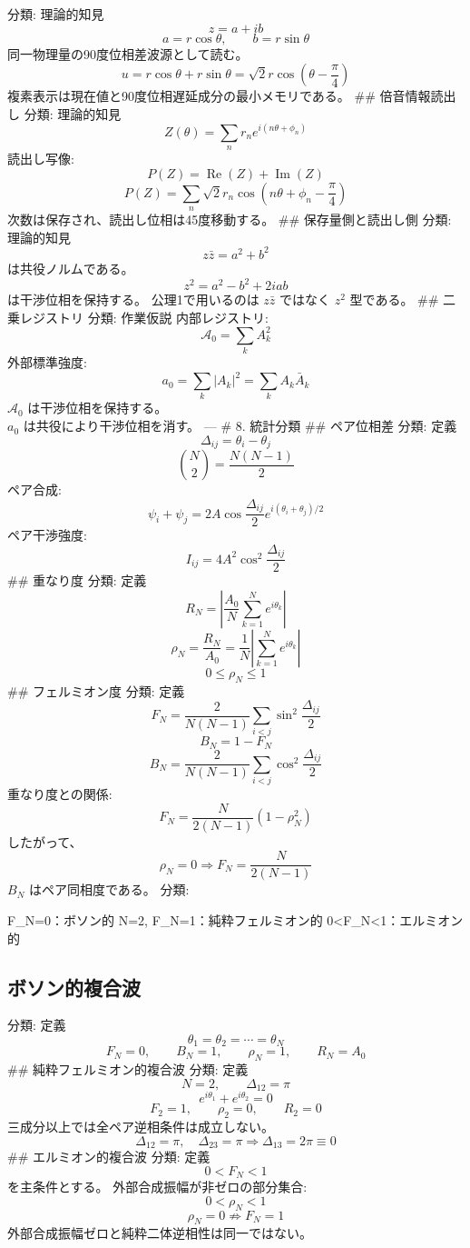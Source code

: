 \documentclass[
  a4paper,
]{ltjsarticle}
\newenvironment{Shaded}{}{}
\newcommand{\NormalTok}[1]{#1}
\begin{document}
分類: 理論的知見 \[
z=a+ib
\] \[
a=r\cos\theta,\qquad b=r\sin\theta
\] 同一物理量の90度位相差波源として読む。 \[
u=r\cos\theta+r\sin\theta
=\sqrt2 r\cos\left(\theta-\frac{\pi}{4}\right)
\] 複素表示は現在値と90度位相遅延成分の最小メモリである。 \#\#
倍音情報読出し 分類: 理論的知見 \[
Z(\theta)=\sum_n r_n e^{i(n\theta+\phi_n)}
\] 読出し写像: \[
P(Z)=\operatorname{Re}(Z)+\operatorname{Im}(Z)
\] \[
P(Z)=\sum_n \sqrt2 r_n
\cos\left(n\theta+\phi_n-\frac{\pi}{4}\right)
\] 次数は保存され、読出し位相は45度移動する。 \#\# 保存量側と読出し側
分類: 理論的知見 \[
z\bar z=a^2+b^2
\] は共役ノルムである。 \[
z^2=a^2-b^2+2iab
\] は干渉位相を保持する。 公理1で用いるのは \(z\bar z\) ではなく \(z^2\)
型である。 \#\# 二乗レジストリ 分類: 作業仮説 内部レジストリ: \[
\mathcal{A}_0=\sum_k A_k^2
\] 外部標準強度: \[
a_0=\sum_k |A_k|^2=\sum_k A_k\bar A_k
\] \(\mathcal{A}_0\) は干渉位相を保持する。\\
\(a_0\) は共役により干渉位相を消す。 --- \# 8. 統計分類 \#\# ペア位相差
分類: 定義 \[
\Delta_{ij}=\theta_i-\theta_j
\] \[
\binom{N}{2}=\frac{N(N-1)}{2}
\] ペア合成: \[
\psi_i+\psi_j
=2A\cos\frac{\Delta_{ij}}{2}e^{i(\theta_i+\theta_j)/2}
\] ペア干渉強度: \[
I_{ij}=4A^2\cos^2\frac{\Delta_{ij}}{2}
\] \#\# 重なり度 分類: 定義 \[
R_N=\left|\frac{A_0}{N}\sum_{k=1}^{N}e^{i\theta_k}\right|
\] \[
\rho_N=\frac{R_N}{A_0}
=\frac{1}{N}\left|\sum_{k=1}^{N}e^{i\theta_k}\right|
\] \[
0\le\rho_N\le1
\] \#\# フェルミオン度 分類: 定義 \[
F_N=
\frac{2}{N(N-1)}
\sum_{i<j}\sin^2\frac{\Delta_{ij}}{2}
\] \[
B_N=1-F_N
\] \[
B_N=
\frac{2}{N(N-1)}
\sum_{i<j}\cos^2\frac{\Delta_{ij}}{2}
\] 重なり度との関係: \[
F_N=\frac{N}{2(N-1)}(1-\rho_N^2)
\] したがって、 \[
\rho_N=0\Rightarrow F_N=\frac{N}{2(N-1)}
\] \(B_N\) はペア同相度である。 分類:

\begin{Shaded}
\begin{Highlighting}[]
\NormalTok{F\_N=0：ボソン的}
\NormalTok{N=2, F\_N=1：純粋フェルミオン的}
\NormalTok{0\textless{}F\_N\textless{}1：エルミオン的}
\end{Highlighting}
\end{Shaded}

\subsection{ボソン的複合波}\label{ux30dcux30bdux30f3ux7684ux8907ux5408ux6ce2}

分類: 定義 \[
\theta_1=\theta_2=\cdots=\theta_N
\] \[
F_N=0,\qquad B_N=1,\qquad \rho_N=1,\qquad R_N=A_0
\] \#\# 純粋フェルミオン的複合波 分類: 定義 \[
N=2,\qquad \Delta_{12}=\pi
\] \[
e^{i\theta_1}+e^{i\theta_2}=0
\] \[
F_2=1,\qquad \rho_2=0,\qquad R_2=0
\] 三成分以上では全ペア逆相条件は成立しない。 \[
\Delta_{12}=\pi,\quad \Delta_{23}=\pi
\Rightarrow
\Delta_{13}=2\pi\equiv0
\] \#\# エルミオン的複合波 分類: 定義 \[
0<F_N<1
\] を主条件とする。 外部合成振幅が非ゼロの部分集合: \[
0<\rho_N<1
\] \[
\rho_N=0\not\Rightarrow F_N=1
\] 外部合成振幅ゼロと純粋二体逆相性は同一ではない。
\end{document}
